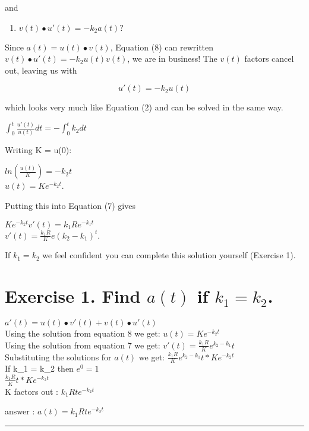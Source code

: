 \documentclass[]{article}
\providecommand{\tightlist}{%
  \setlength{\itemsep}{0pt}\setlength{\parskip}{0pt}}
\begin{document}
and

\begin{enumerate}
\def\labelenumi{(\arabic{enumi})}
\setcounter{enumi}{7}
\tightlist
\item
  \(v(t) \bullet u'(t) = -k_2a(t)?\)
\end{enumerate}

Since \(a(t) = u(t) \bullet v(t)\), Equation (8) can rewritten
\(v(t) \bullet u'(t) = -k_2u(t)v(t)\), we are in business! The \(v(t)\)
factors cancel out, leaving us with

\[u'(t) = -k_2u(t)\]

which looks very much like Equation (2) and can be solved in the same
way.

\(\int_0^t \frac{u'(t)}{u(t)} dt = -\int_0^t k_2dt\)

Writing K = u(0):

\(ln (\frac{u(t)}{K}) = -k_2t\)\\
\(u(t) = Ke^{-k_2t}\).

Putting this into Equation (7) gives

\(Ke^{-k_2t}v'(t) = k_1Re^{-k_1t}\)\\
\(v'(t) = \frac{k_1R}{K}e(k_2-k_1)^t\).

If \(k_1 = k_2\) we feel confident you can complete this solution
yourself (Exercise 1).

\section{\texorpdfstring{Exercise 1. Find \(a(t)\) if
\(k_1 = k_2\).}{Exercise 1. Find a(t) if k\_1 = k\_2.}}\label{exercise-1.-find-at-if-k_1-k_2.}

\(a'(t) = u(t) \bullet v'(t) + v(t) \bullet u'(t)\)\\
Using the solution from equation 8 we get: \(u(t) = Ke^{-k_2t}\)\\
Using the solution from equation 7 we get:
\(v'(t) = \frac{k_1R}{K}e^{k_2 - k_1}t\)\\
Substituting the solutions for \(a(t)\) we get:
\(\frac{k_1R}{K}e^{k_2 - k_1}t * Ke^{-k_2t}\)\\
If k\_1 = k\_2 then \(e^{0} = 1\)\\
\(\frac{k_1R}{K}t * Ke^{-k_2t}\)\\
K factors out : \(k_1Rte^{-k_2t}\)

answer : \(a(t) = k_1Rte^{-k_2t}\)

\begin{center}\rule{0.5\linewidth}{\linethickness}\end{center}
\end{document}
